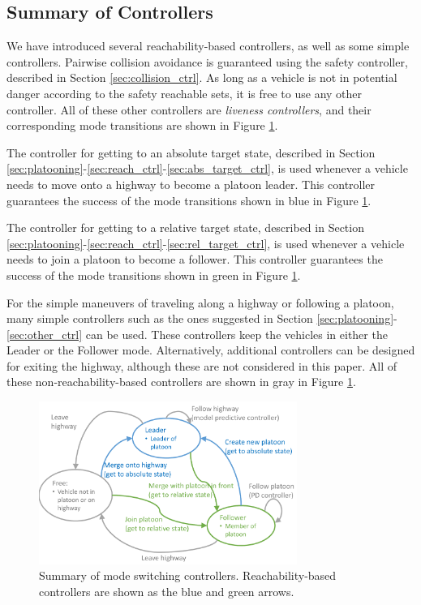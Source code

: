 \subsection{Summary of Controllers}
We have introduced several reachability-based controllers, as well as some simple controllers. Pairwise collision avoidance is guaranteed using the safety controller, described in Section \ref{sec:collision_ctrl}. As long as a vehicle is not in potential danger according to the safety reachable sets, it is free to use any other controller. All of these other controllers are \textit{liveness controllers}, and their corresponding mode transitions are shown in Figure \ref{fig:modeControllers}.

The controller for getting to an absolute target state, described in Section \ref{sec:platooning}-\ref{sec:reach_ctrl}-\ref{sec:abs_target_ctrl}, is used whenever a vehicle needs to move onto a highway to become a platoon leader. This controller guarantees the success of the mode transitions shown in blue in Figure \ref{fig:modeControllers}.

The controller for getting to a relative target state, described in Section \ref{sec:platooning}-\ref{sec:reach_ctrl}-\ref{sec:rel_target_ctrl}, is used whenever a vehicle needs to join a platoon to become a follower. This controller guarantees the success of the mode transitions shown in green in Figure \ref{fig:modeControllers}.

For the simple maneuvers of traveling along a highway or following a platoon, many simple controllers such as the ones suggested in Section \ref{sec:platooning}-\ref{sec:other_ctrl} can be used. These controllers keep the vehicles in either the Leader or the Follower mode. Alternatively, additional controllers can be designed for exiting the highway, although these are not considered in this paper. All of these non-reachability-based controllers are shown in gray in Figure \ref{fig:modeControllers}.

\begin{figure}
	\centering
	\includegraphics[width=0.75\textwidth]{"fig/modeControllers"}
	\caption{Summary of mode switching controllers. Reachability-based controllers are shown as the blue and green arrows.}
	\label{fig:modeControllers}
\end{figure}